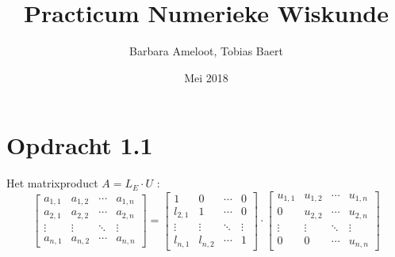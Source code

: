 \documentclass[a4paper]{article}
\title{Practicum Numerieke Wiskunde}
\author{Barbara Ameloot, Tobias Baert}
\date{Mei 2018}
\begin{document}
\maketitle
   \section*{Opdracht 1.1}
Het matrixproduct  $A=L_{E}\cdot U$ :
\\
\[
 \begin{bmatrix}
  a_{1,1} & a_{1,2} & \cdots & a_{1,n} \\
  a_{2,1} & a_{2,2} & \cdots & a_{2,n} \\
  \vdots  & \vdots  & \ddots & \vdots  \\
  a_{n,1} & a_{n,2} & \cdots & a_{n,n} 
 \end{bmatrix}
=
\begin{bmatrix}
 1 & 0 & \cdots & 0 \\
  l_{2,1} &1 & \cdots &0 \\
  \vdots  & \vdots  & \ddots & \vdots  \\
  l_{n,1} &l_{n,2} & \cdots & 1 
\end{bmatrix}
\cdot
\begin{bmatrix}
  u_{1,1} & u_{1,2} & \cdots & u_{1,n} \\
  0 & u_{2,2} & \cdots & u_{2,n} \\
  \vdots  & \vdots  & \ddots & \vdots  \\
 0 & 0 & \cdots & u_{n,n}
\end{bmatrix}
\]
\\
\end{document}
